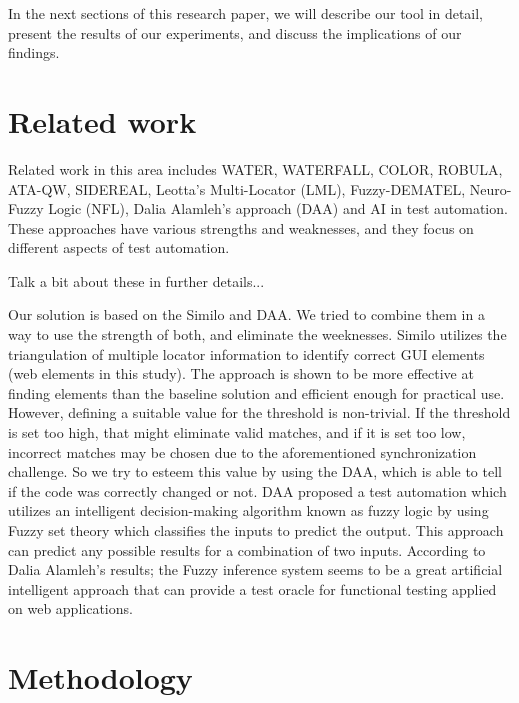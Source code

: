 \documentclass{article}
\begin{document}
In the next sections of this research paper, we will describe our tool in detail, present the results of our experiments, and discuss the implications of our findings.

\maketitle

\section{Related work}

Related work in this area includes WATER, WATERFALL, COLOR, ROBULA, ATA-QW, SIDEREAL, Leotta's Multi-Locator (LML), Fuzzy-DEMATEL, Neuro-Fuzzy Logic (NFL), Dalia Alamleh's approach (DAA) and AI in test automation. These approaches have various strengths and weaknesses, and they focus on different aspects of test automation.

Talk a bit about these in further details...

Our solution is based on the Similo and DAA. We tried to combine them in a way to use the strength of both, and eliminate the weeknesses. Similo utilizes the triangulation of multiple locator information to identify correct GUI elements (web elements in this study). The approach is shown to be more effective at finding elements than the baseline solution and efficient enough for practical use. However, defining a suitable value for the threshold is non-trivial. If the threshold is set too high, that might eliminate valid matches, and if it is set too low, incorrect matches may be chosen due to the aforementioned synchronization challenge. So we try to esteem this value by using the DAA, which is able to tell if the code was correctly changed or not. DAA proposed a test automation which utilizes an intelligent decision-making algorithm known as fuzzy logic by using Fuzzy set theory which classifies the inputs to predict the output. This approach can predict any possible results for a combination of two inputs. According to Dalia Alamleh's results; the Fuzzy inference system seems to be a great artificial intelligent approach that can provide a test oracle for functional testing applied on web applications.

\maketitle

\section{Methodology}
\end{document}
